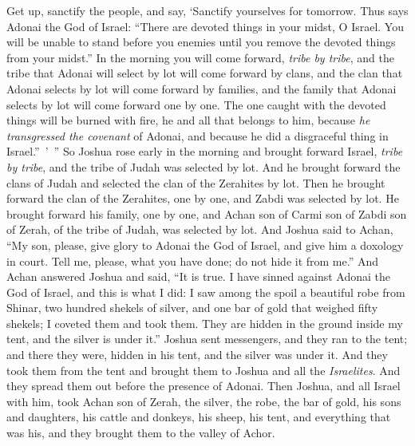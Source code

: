 \begin{biblechapter}
\verse Get up, sanctify the people, and say, ‘Sanctify yourselves for tomorrow. Thus says Adonai the God of Israel: “There are devoted things in your midst, O Israel. You will be unable to stand before you enemies until you remove the devoted things from your midst.”
\verse In the morning you will come forward, \textit{tribe by tribe}, and the tribe that Adonai will select by lot will come forward by clans, and the clan that Adonai selects by lot will come forward by families, and the family that Adonai selects by lot will come forward one by one.
\verse The one caught with the devoted things will be burned with fire, he and all that belongs to him, because \textit{he transgressed the covenant} of Adonai, and because he did a disgraceful thing in Israel.” ’ ”
\verse So Joshua rose early in the morning and brought forward Israel, \textit{tribe by tribe}, and the tribe of Judah was selected by lot.
\verse And he brought forward the clans of Judah and selected the clan of the Zerahites by lot. Then he brought forward the clan of the Zerahites, one by one, and Zabdi was selected by lot.
\verse He brought forward his family, one by one, and Achan son of Carmi son of Zabdi son of Zerah, of the tribe of Judah, was selected by lot.
\verse And Joshua said to Achan, “My son, please, give glory to Adonai the God of Israel, and give him a doxology in court. Tell me, please, what you have done; do not hide it from me.”
\verse And Achan answered Joshua and said, “It is true. I have sinned against Adonai the God of Israel, and this is what I did:
\verse I saw among the spoil a beautiful robe from Shinar, two hundred shekels of silver, and one bar of gold that weighed fifty shekels; I coveted them and took them. They are hidden in the ground inside my tent, and the silver is under it.”
\verse Joshua sent messengers, and they ran to the tent; and there they were, hidden in his tent, and the silver was under it.
\verse And they took them from the tent and brought them to Joshua and all the \textit{Israelites}. And they spread them out before the presence of Adonai.
\verse Then Joshua, and all Israel with him, took Achan son of Zerah, the silver, the robe, the bar of gold, his sons and daughters, his cattle and donkeys, his sheep, his tent, and everything that was his, and they brought them to the valley of Achor.

\end{biblechapter}
